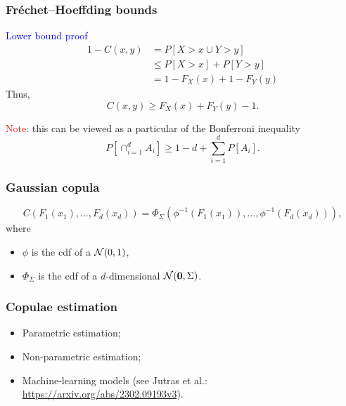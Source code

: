 \documentclass{beamer}
\begin{document}
\begin{frame}
\frametitle{Fréchet–Hoeffding bounds}

\textcolor{blue}{Lower bound proof}
\begin{align*}
1 - C(x,y) &= P[X > x \cup Y > y] \\
& \leq P[X > x] + P[Y > y] \\
& = 1 - F_X(x) + 1 - F_Y(y)
\end{align*}
Thus,
$$
C(x,y) \geq F_X(x) + F_Y(y) - 1.
$$

\mbox{}

\textcolor{red}{Note:} this can be viewed as a particular of the Bonferroni inequality
$$
P \left[ \cap_{i = 1}^d A_i \right] \geq 1-d+\sum_{i = 1}^d P [A_i].
$$

\end{frame}

\begin{frame}
\frametitle{Gaussian copula}

$$
	C \left( F_1(x_1), \ldots, F_d(x_d) \right)
	= \Phi_{\Sigma} \left( \phi^{-1} \left( F_1(x_1) \right),\ldots, \phi^{-1}\left( F_d(x_d) \right) \right),
$$
where
\begin{itemize}
	\item $\phi$ is the cdf of a ${\mathcal{N}}(0,1)$,
	\item $\Phi_{\Sigma}$ is the cdf of a $d$-dimensional ${\mathcal{N}}({\boldsymbol{0}},\Sigma)$.
\end{itemize}

\end{frame}

\begin{frame}
\frametitle{Copulae estimation}

\begin{itemize}
	\item Parametric estimation;
	\item Non-parametric estimation;
	\item Machine-learning models (see Jutras et al.: \url{https://arxiv.org/abs/2302.09193v3}).
\end{itemize}

\end{frame}
	
\end{document}
